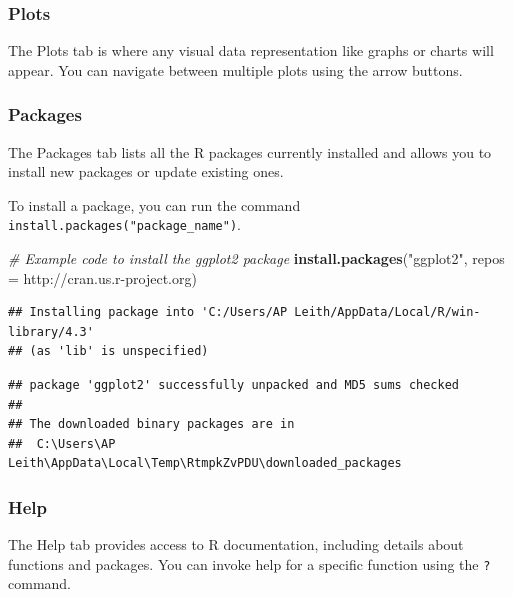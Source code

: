 \documentclass[
  b5paper]{book}
\newenvironment{Shaded}{\begin{snugshade}}{\end{snugshade}}
\newcommand{\AttributeTok}[1]{\textcolor[rgb]{0.13,0.29,0.53}{#1}}
\newcommand{\CommentTok}[1]{\textcolor[rgb]{0.56,0.35,0.01}{\textit{#1}}}
\newcommand{\FunctionTok}[1]{\textcolor[rgb]{0.13,0.29,0.53}{\textbf{#1}}}
\newcommand{\NormalTok}[1]{#1}
\newcommand{\StringTok}[1]{\textcolor[rgb]{0.31,0.60,0.02}{#1}}
\begin{document}
\hypertarget{plots}{%
\subsubsection*{Plots}\label{plots}}

The Plots tab is where any visual data representation like graphs or charts will appear. You can navigate between multiple plots using the arrow buttons.

\hypertarget{packages}{%
\subsubsection*{Packages}\label{packages}}

The Packages tab lists all the R packages currently installed and allows you to install new packages or update existing ones.

To install a package, you can run the command \texttt{install.packages("package\_name")}.

\begin{Shaded}
\begin{Highlighting}[]
\CommentTok{\# Example code to install the \textquotesingle{}ggplot2\textquotesingle{} package }
\FunctionTok{install.packages}\NormalTok{(}\StringTok{"ggplot2"}\NormalTok{, }\AttributeTok{repos =} \StringTok{\textquotesingle{}http://cran.us.r{-}project.org\textquotesingle{}}\NormalTok{)}
\end{Highlighting}
\end{Shaded}

\begin{verbatim}
## Installing package into 'C:/Users/AP Leith/AppData/Local/R/win-library/4.3'
## (as 'lib' is unspecified)
\end{verbatim}

\begin{verbatim}
## package 'ggplot2' successfully unpacked and MD5 sums checked
## 
## The downloaded binary packages are in
##  C:\Users\AP Leith\AppData\Local\Temp\RtmpkZvPDU\downloaded_packages
\end{verbatim}

\hypertarget{help}{%
\subsubsection*{Help}\label{help}}

The Help tab provides access to R documentation, including details about functions and packages. You can invoke help for a specific function using the \texttt{?} command.
\end{document}
